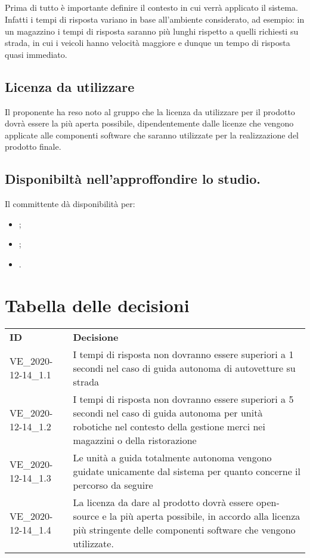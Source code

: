 \documentclass[]{article}
\begin{document}
		\subsection{}
		Prima di tutto è importante definire il contesto in cui verrà applicato il sistema.\\
		Infatti i tempi di risposta variano in base all'ambiente considerato, ad esempio: in un magazzino i tempi di risposta saranno più lunghi
		rispetto a quelli richiesti su strada, in cui i veicoli hanno velocità maggiore e dunque un tempo di risposta quasi immediato.

		\subsection{Licenza da utilizzare}
		Il proponente ha reso noto al gruppo che la licenza  da utilizzare per il prodotto dovrà essere la più aperta possibile, dipendentemente dalle licenze che vengono applicate alle componenti software che saranno utilizzate per la realizzazione del prodotto finale.

		\subsection{Disponibiltà nell'approffondire lo studio.}
		Il committente dà disponibilità per:
		\begin{itemize}
			\item {};
			\item {};
			\item {}.
		\end{itemize}

		\section{Tabella delle decisioni}

		\begin{table} [h!]
			\begin{center}
				\begin{tabular} { m{2cm} m{14cm} }
					\rowcolor{lightgray}
					\textbf{ID} & \textbf{Decisione}\\
					VE\_2020-12-14\_1.1 & I tempi di risposta non dovranno essere superiori a 1 secondi nel caso di guida autonoma di autovetture su strada \\
					VE\_2020-12-14\_1.2 & I tempi di risposta non dovranno essere superiori a 5 secondi nel caso di guida autonoma per unità robotiche nel contesto della gestione merci nei magazzini o della ristorazione \\
					VE\_2020-12-14\_1.3 & Le unità a guida totalmente autonoma vengono guidate unicamente dal sistema per quanto concerne il percorso da seguire \\
					VE\_2020-12-14\_1.4 & La licenza da dare al prodotto dovrà essere open-source e la più aperta possibile, in accordo alla licenza più stringente delle componenti software che vengono utilizzate.
				\end{tabular}
			\end{center}
		\end{table}
\end{document}
